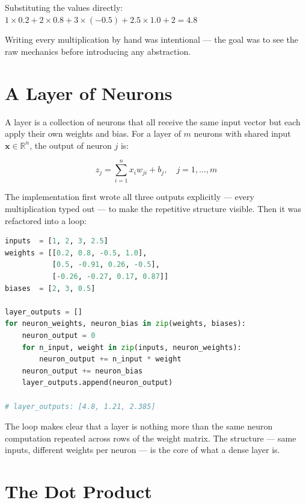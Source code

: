 \documentclass[12pt,a4paper]{report}
\begin{document}
Substituting the values directly:
$1 \times 0.2 + 2 \times 0.8 + 3 \times (-0.5) + 2.5 \times 1.0 + 2 = 4.8$

Writing every multiplication by hand was intentional — the goal was to see the raw mechanics
before introducing any abstraction.

\section{A Layer of Neurons}

A layer is a collection of neurons that all receive the same input vector but each apply
their own weights and bias. For a layer of $m$ neurons with shared input
$\mathbf{x} \in \mathbb{R}^n$, the output of neuron $j$ is:

\begin{equation}
    z_j = \sum_{i=1}^{n} x_i w_{ji} + b_j, \quad j = 1, \ldots, m
\end{equation}

The implementation first wrote all three outputs explicitly — every multiplication typed out —
to make the repetitive structure visible. Then it was refactored into a loop:

\begin{lstlisting}[language=Python]
inputs  = [1, 2, 3, 2.5]
weights = [[0.2, 0.8, -0.5, 1.0],
           [0.5, -0.91, 0.26, -0.5],
           [-0.26, -0.27, 0.17, 0.87]]
biases  = [2, 3, 0.5]

layer_outputs = []
for neuron_weights, neuron_bias in zip(weights, biases):
    neuron_output = 0
    for n_input, weight in zip(inputs, neuron_weights):
        neuron_output += n_input * weight
    neuron_output += neuron_bias
    layer_outputs.append(neuron_output)

# layer_outputs: [4.8, 1.21, 2.385]
\end{lstlisting}

The loop makes clear that a layer is nothing more than the same neuron computation
repeated across rows of the weight matrix. The structure — same inputs, different weights
per neuron — is the core of what a dense layer is.

\section{The Dot Product}
\end{document}
